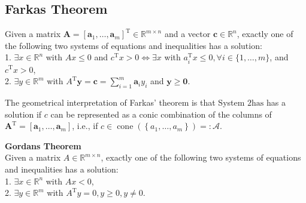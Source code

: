 \documentclass[english]{latex4ei_sheet}
\begin{document}
\begin{sectionbox}
\subsection{Farkas Theorem}
\begin{emphbox}
	\begin{flushleft}


Given a matrix $\boldsymbol{A}=\left[\boldsymbol{a}_{1}, \ldots, \boldsymbol{a}_{m}\right]^{\mathrm{T}} \in \mathbb{R}^{m \times n}$ and a vector $\boldsymbol{c} \in \mathbb{R}^{n}$, exactly one of the following two systems of equations and inequalities has a solution:\\

1. $\exists x \in \mathbb{R}^{n}$ with $A x \leq 0$ and $c^{\mathrm{T}} x>0 \Leftrightarrow \exists x$ with $a_{i}^{\mathrm{T}} x \leq 0, \forall i \in\{1, \ldots, m\}$, and $c^{\mathrm{T}} x>0$,\\

2. $\exists y \in \mathbb{R}^{m}$ with $A^{\mathrm{T}} \boldsymbol{y}=\boldsymbol{c}=\sum_{i=1}^{m} \boldsymbol{a}_{i} y_{i}$ and $\boldsymbol{y} \geq \mathbf{0}$.
	\end{flushleft}
\end{emphbox}
The geometrical interpretation of Farkas' theorem is that System $2 \mathrm{has}$ has a solution if $c$ can be represented as a conic combination of the columns of $\boldsymbol{A}^{\mathrm{T}}=\left[\boldsymbol{a}_{1}, \ldots, \boldsymbol{a}_{m}\right]$, i.e., if $c \in \operatorname{cone}\left(\left\{a_{1}, \ldots, a_{m}\right\}\right)=: \mathcal{A}$.

\textbf{Gordans Theorem}\\
Given a matrix $A \in \mathbb{R}^{m \times n}$, exactly one of the following two systems of equations and inequalities has a solution:\\
1. $\exists x \in \mathbb{R}^{n}$ with $A x<0$,\\
2. $\exists y \in \mathbb{R}^{m}$ with $A^{\mathrm{T}} y=0, y \geq 0, y \neq 0$.
\end{sectionbox}
\end{document}

